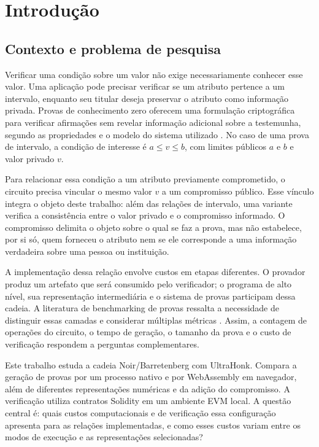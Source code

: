 \chapter{Introdução}
\label{cap:introducao}

\section{Contexto e problema de pesquisa}

Verificar uma condição sobre um valor não exige necessariamente conhecer esse valor. Uma aplicação pode precisar verificar se um atributo pertence a um intervalo, enquanto seu titular deseja preservar o atributo como informação privada. Provas de conhecimento zero oferecem uma formulação criptográfica para verificar afirmações sem revelar informação adicional sobre a testemunha, segundo as propriedades e o modelo do sistema utilizado \cite{zkproofref}. No caso de uma prova de intervalo, a condição de interesse é $a \leq v \leq b$, com limites públicos $a$ e $b$ e valor privado $v$.

Para relacionar essa condição a um atributo previamente comprometido, o circuito precisa vincular o mesmo valor $v$ a um compromisso público. Esse vínculo integra o objeto deste trabalho: além das relações de intervalo, uma variante verifica a consistência entre o valor privado e o compromisso informado. O compromisso delimita o objeto sobre o qual se faz a prova, mas não estabelece, por si só, quem forneceu o atributo nem se ele corresponde a uma informação verdadeira sobre uma pessoa ou instituição.

A implementação dessa relação envolve custos em etapas diferentes. O provador produz um artefato que será consumido pelo verificador; o programa de alto nível, sua representação intermediária e o sistema de provas participam dessa cadeia. A literatura de benchmarking de provas ressalta a necessidade de distinguir essas camadas e considerar múltiplas métricas \cite{zkbenchmark}. Assim, a contagem de operações do circuito, o tempo de geração, o tamanho da prova e o custo de verificação respondem a perguntas complementares.

Este trabalho estuda a cadeia Noir/Barretenberg com UltraHonk. Compara a geração de provas por um processo nativo e por WebAssembly em navegador, além de diferentes representações numéricas e da adição do compromisso. A verificação utiliza contratos Solidity em um ambiente EVM local. A questão central é: quais custos computacionais e de verificação essa configuração apresenta para as relações implementadas, e como esses custos variam entre os modos de execução e as representações selecionadas?


